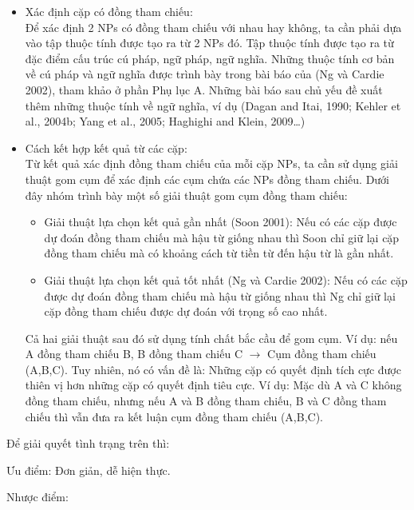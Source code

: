 \documentclass[12pt]{extarticle}
\begin{document}
				\begin{itemize}
					\item{Xác định cặp có đồng tham chiếu: 
						\\Để xác định 2 NPs có đồng tham chiếu với nhau hay không, ta cần phải dựa vào tập thuộc tính được tạo ra từ 2 NPs đó. Tập thuộc tính được tạo ra từ đặc điểm cấu trúc cú pháp, ngữ pháp, ngữ nghĩa. Những thuộc tính cơ bản về cú pháp và ngữ nghĩa được trình bày trong bài báo của (Ng và Cardie 2002), tham khảo ở phần Phụ lục A. Những bài báo sau chủ yếu đề xuất thêm những thuộc tính về ngữ nghĩa, ví dụ (Dagan and Itai, 1990; Kehler et al., 2004b; Yang et al., 2005; Haghighi and Klein, 2009…)}
					\item{Cách kết hợp kết quả từ các cặp: 
						\\Từ kết quả xác định đồng tham chiếu của mỗi cặp NPs, ta cần sử dụng giải thuật gom cụm để xác định các cụm chứa các NPs đồng tham chiếu. Dưới đây nhóm trình bày một số giải thuật gom cụm đồng tham chiếu:
						\begin{itemize}
							\item{Giải thuật lựa chọn kết quả gần nhất (Soon 2001): Nếu có các cặp được dự đoán đồng tham chiếu mà hậu từ giống nhau thì Soon chỉ giữ lại cặp đồng tham chiếu mà có khoảng cách từ tiền từ đến hậu từ là gần nhất.}
							\item{Giải thuật lựa chọn kết quả tốt nhất (Ng và Cardie 2002): Nếu có các cặp được dự đoán đồng tham chiếu mà hậu từ giống nhau thì Ng chỉ giữ lại cặp đồng tham chiếu được dự đoán với trọng số cao nhất.}
						\end{itemize}}
						\par Cả hai giải thuật sau đó sử dụng  tính chất bắc cầu để gom cụm. Ví dụ: nếu A đồng tham chiếu B, B đồng tham chiếu C $\rightarrow$ Cụm đồng tham chiếu (A,B,C). Tuy nhiên, nó có vấn đề là: Những cặp có quyết định tích cực được thiên vị hơn những cặp có quyết định tiêu cực. Ví dụ: Mặc dù A và C không đồng tham chiếu, nhưng nếu A và B đồng tham chiếu, B và C đồng tham chiếu thì vẫn đưa ra kết luận cụm đồng tham chiếu (A,B,C).
				\end{itemize}			 
				\par Để giải quyết tình trạng trên thì:
				\par Ưu điểm: Đơn giản, dễ hiện thực.
				\par Nhược điểm:
\end{document}
